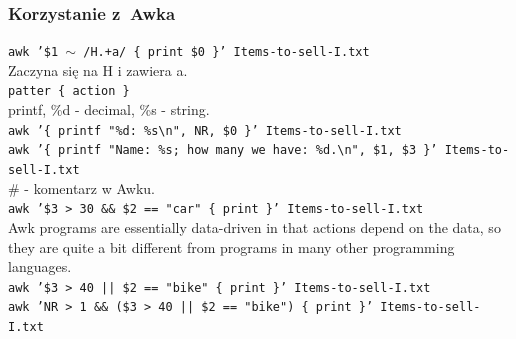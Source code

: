 \documentclass[10pt,t]{beamer}
\begin{document}
\begin{frame}
  \frametitle{Korzystanie z~Awka}


  \texttt{awk '\$1 $\sim$ /H.+a/ \{ print \$0 \}' Items-to-sell-I.txt} \\
  Zaczyna się na H i zawiera a. \\
  \texttt{patter \{ action \}} \\
  printf, \%d - decimal, \%s - string. \\
  \texttt{awk '\{ printf "\%d: \%s\textbackslash n", NR, \$0 \}'
    Items-to-sell-I.txt} \\
  \texttt{awk '\{ printf "Name: \%s; how many we have:
    \%d.\textbackslash n", \$1, \$3 \}' Items-to-sell-I.txt} \\
  \# - komentarz w Awku. \\
  \texttt{awk '\$3 > 30 \&\& \$2 == "car" \{ print \}' Items-to-sell-I.txt} \\
  Awk programs are essentially data-driven in that actions
  depend on the data, so they are quite a bit different from
  programs in many other programming languages. \\
  \texttt{awk '\$3 > 40 || \$2 == "bike" \{ print \}' Items-to-sell-I.txt} \\
  \texttt{awk 'NR > 1 \&\& (\$3 > 40 || \$2 == "bike") \{ print \}'
    Items-to-sell-I.txt} \\


\end{frame}
\end{document}
